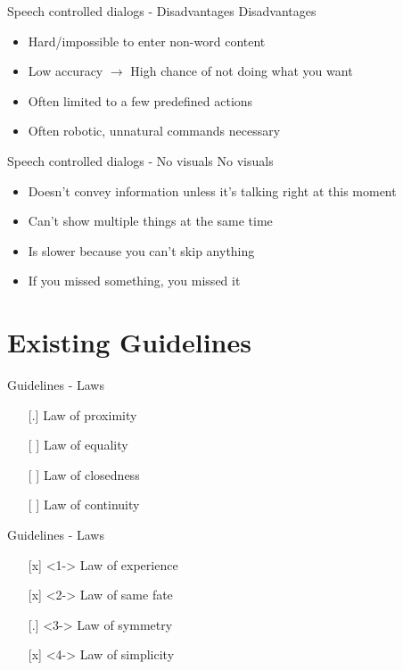 \documentclass[
  10pt
, handout
]{beamer}
\begin{document}
\begin{frame}{Speech controlled dialogs - Disadvantages}
  Disadvantages

  \begin{itemize}
    \item<+-> Hard/impossible to enter non-word content
    \item<+-> Low accuracy $\rightarrow$ High chance of not doing what you want
    \item<+-> Often limited to a few predefined actions
    \item<+-> Often robotic, unnatural commands necessary
  \end{itemize}
\end{frame}

\begin{frame}{Speech controlled dialogs - No visuals}
  No visuals

  \begin{itemize}
    \item Doesn't convey information unless it's talking right at this moment
    \item Can't show multiple things at the same time
    \item Is slower because you can't skip anything
    \item If you missed something, you missed it
  \end{itemize}
\end{frame}

\section{Existing Guidelines}  %

\begin{frame}{Guidelines - Laws}
  \begin{itemize}
    \item[{[.]}] Law of proximity
    \item[{[ ]}] Law of equality
    \item[{[ ]}] Law of closedness
    \item[{[ ]}] Law of continuity
  \end{itemize}
\end{frame}

\begin{frame}{Guidelines - Laws}
  \begin{itemize}
    \item[{[x]}]<1-> Law of experience
    \item[{[x]}]<2-> Law of same fate
    \item[{[.]}]<3-> Law of symmetry
    \item[{[x]}]<4-> Law of simplicity
  \end{itemize}
\end{frame}
\end{document}
